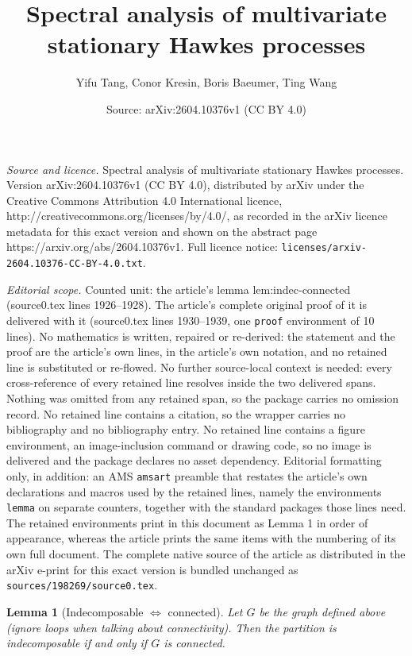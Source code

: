 \documentclass[10pt,a4paper]{amsart}
\title{Spectral analysis of multivariate stationary Hawkes processes}
\author{Yifu Tang, Conor Kresin, Boris Baeumer, Ting Wang}
\date{Source: arXiv:2604.10376v1 (CC BY 4.0)}
\newtheorem{lemma}{Lemma}
\begin{document}
\maketitle

\noindent\emph{Source and licence.} Spectral analysis of multivariate stationary Hawkes processes. Version arXiv:2604.10376v1 (CC BY 4.0), distributed by arXiv under the Creative Commons Attribution 4.0 International licence, http://creativecommons.org/licenses/by/4.0/, as recorded in the arXiv licence metadata for this exact version and shown on the abstract page https://arxiv.org/abs/2604.10376v1. Full licence notice: \texttt{licenses/arxiv-2604.10376-CC-BY-4.0.txt}.\par\smallskip

\noindent\textit{Editorial scope.} Counted unit: the article's lemma lem:indec-connected (source0.tex lines 1926--1928). The article's complete original proof of it is delivered with it (source0.tex lines 1930--1939, one \texttt{proof} environment of 10 lines). No mathematics is written, repaired or re-derived: the statement and the proof are the article's own lines, in the article's own notation, and no retained line is substituted or re-flowed.  No further source-local context is needed: every cross-reference of every retained line resolves inside the two delivered spans.  Nothing was omitted from any retained span, so the package carries no omission record.  No retained line contains a citation, so the wrapper carries no bibliography and no bibliography entry.  No retained line contains a figure environment, an image-inclusion command or drawing code, so no image is delivered and the package declares no asset dependency.  Editorial formatting only, in addition: an AMS \texttt{amsart} preamble that restates the article's own declarations and macros used by the retained lines, namely the environments \texttt{lemma} on separate counters, together with the standard packages those lines need.  The retained environments print in this document as Lemma 1 in order of appearance, whereas the article prints the same items with the numbering of its own full document.  The complete native source of the article as distributed in the arXiv e-print for this exact version is bundled unchanged as \texttt{sources/198269/source0.tex}.
\begin{lemma}[Indecomposable $\iff$ connected]\label{lem:indec-connected}
Let $G$ be the graph defined above (ignore loops when talking about connectivity). Then the partition is indecomposable if and only if $G$ is connected.
\end{lemma}
\end{document}
